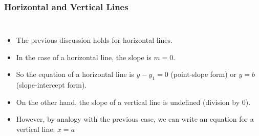 \documentclass[serif,ignorenonframetext]{beamer}
\begin{document}
\begin{frame}
  \frametitle{Horizontal and Vertical Lines}
  \begin{columns}
    \begin{itemize}[<+->]
    \item The previous discussion holds for horizontal lines.
    \item In the case of a horizontal line, the slope is $m=0$.
    \item So the equation of a horizontal line is $y-y_1=0$
      (point-slope form) or $y=b$ (slope-intercept form).
    \item On the other hand, the slope of a vertical line is undefined
      (division by $0$).
    \item However, by analogy with the previous case, we can write an
      equation for a vertical line: $x=a$
    \end{itemize}
  \end{columns}
\end{frame}
\end{document}
